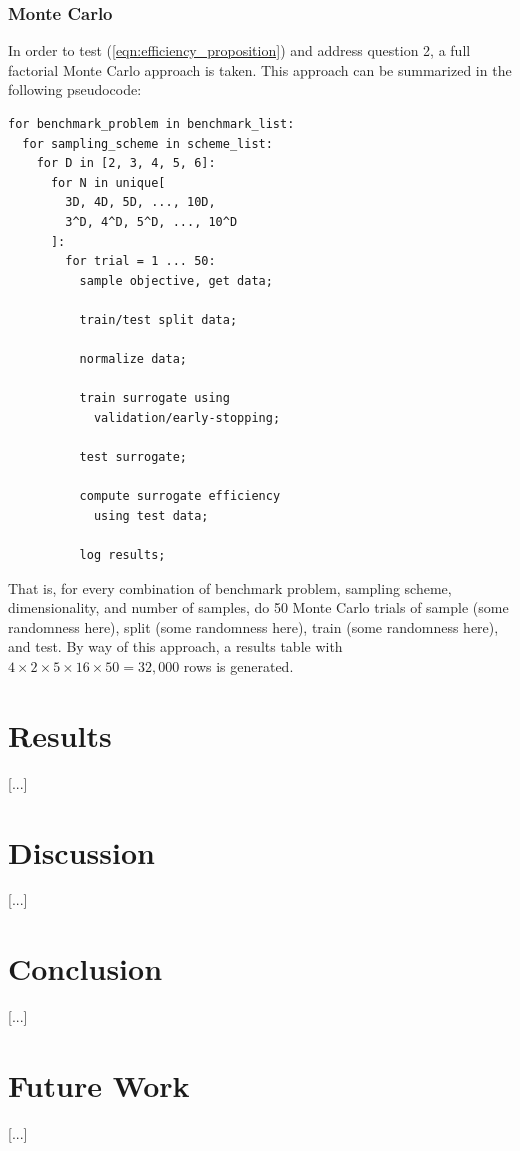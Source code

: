 \documentclass[conference]{IEEEtran}
\begin{document}
\subsubsection{Monte Carlo}

In order to test (\ref{eqn:efficiency_proposition}) and address question 2, a full factorial Monte Carlo approach is taken. This approach can be summarized in the following pseudocode:

\begin{verbatim}
for benchmark_problem in benchmark_list:
  for sampling_scheme in scheme_list:
    for D in [2, 3, 4, 5, 6]:
      for N in unique[
      	3D, 4D, 5D, ..., 10D,
      	3^D, 4^D, 5^D, ..., 10^D
      ]:
        for trial = 1 ... 50:
          sample objective, get data;
      
          train/test split data;
      
          normalize data;
      
          train surrogate using
            validation/early-stopping;
        
          test surrogate;
        
          compute surrogate efficiency
            using test data;
        
          log results;
\end{verbatim}

\noindent That is, for every combination of benchmark problem, sampling scheme, dimensionality, and number of samples, do 50 Monte Carlo trials of sample (some randomness here), split (some randomness here), train (some randomness here), and test. By way of this approach, a results table with $4\times 2\times 5\times 16\times 50 = 32,000$ rows is generated.

\section{Results}

[...]

\section{Discussion}

[...]

\section{Conclusion}

[...]

\section{Future Work}

[...]



{}

\end{document}
